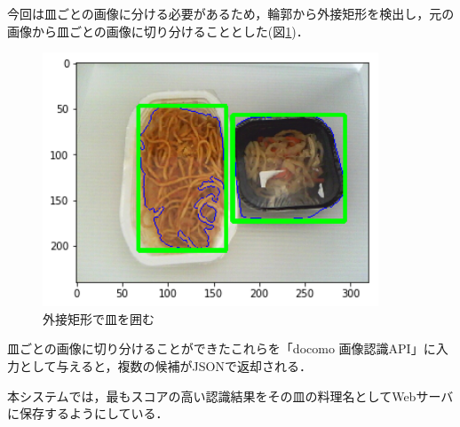 \documentclass[../report]{subfiles}
\begin{document}
今回は皿ごとの画像に分ける必要があるため，輪郭から外接矩形を検出し，元の画像から皿ごとの画像に切り分けることとした(図\ref{fig:6-bounding})．

\begin{figure}[htbp]
    \begin{center}
        \includegraphics[width=10cm]{imgs/6_bounding.png}
        \caption{外接矩形で皿を囲む}
        \label{fig:6-bounding}
    \end{center}
\end{figure}

皿ごとの画像に切り分けることができたこれらを「docomo 画像認識API」に入力として与えると，複数の候補がJSONで返却される．

本システムでは，最もスコアの高い認識結果をその皿の料理名としてWebサーバに保存するようにしている．
\end{document}
